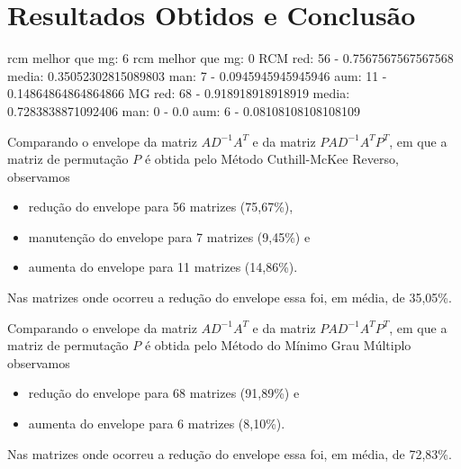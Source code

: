 \section{Resultados Obtidos e Conclusão}

rcm melhor que mg: 6
rcm melhor que mg: 0
RCM
red: 56 - 0.7567567567567568
media: 0.35052302815089803
man: 7 - 0.0945945945945946
aum: 11 - 0.14864864864864866
MG
red: 68 - 0.918918918918919
media: 0.7283838871092406
man: 0 - 0.0
aum: 6 - 0.08108108108108109

Comparando o envelope da matriz $A D^{-1} A^T$ e da matriz $P A D^{-1} A^T P^T$,
em que a matriz de permutação $P$ é obtida pelo Método Cuthill-McKee Reverso,
observamos
\begin{itemize}
    \item redução do envelope para 56 matrizes (75,67\%),
    \item manutenção do envelope para 7 matrizes (9,45\%) e
    \item aumenta do envelope para 11 matrizes (14,86\%).
\end{itemize}
Nas matrizes onde ocorreu a redução do envelope essa foi, em média, de 35,05\%.

Comparando o envelope da matriz $A D^{-1} A^T$ e da matriz $P A D^{-1} A^T P^T$,
em que a matriz de permutação $P$ é obtida pelo Método do Mínimo Grau Múltiplo
observamos
\begin{itemize}
    \item redução do envelope para 68 matrizes (91,89\%) e
    \item aumenta do envelope para 6 matrizes (8,10\%).
\end{itemize}
Nas matrizes onde ocorreu a redução do envelope essa foi, em média, de 72,83\%.


